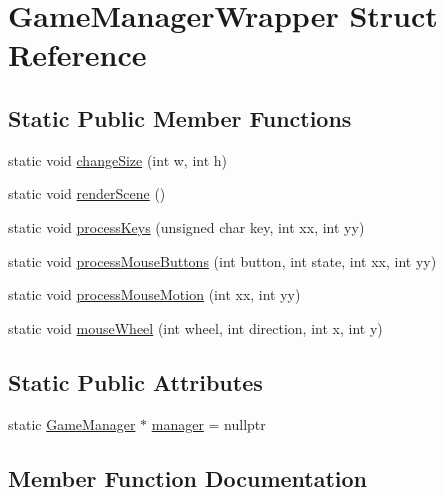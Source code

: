 \hypertarget{struct_game_manager_wrapper}{}\section{Game\+Manager\+Wrapper Struct Reference}
\label{struct_game_manager_wrapper}
\subsection*{Static Public Member Functions}
\begin{DoxyCompactItemize}
\item 
static void \hyperlink{struct_game_manager_wrapper_a5ef7f6979833682944d4d3bedbc78b13}{change\+Size} (int w, int h)
\item 
static void \hyperlink{struct_game_manager_wrapper_a9a5d501d0990f753029d712684421c5c}{render\+Scene} ()
\item 
static void \hyperlink{struct_game_manager_wrapper_a22481b9f1883dbedf4471622261b6530}{process\+Keys} (unsigned char key, int xx, int yy)
\item 
static void \hyperlink{struct_game_manager_wrapper_a517584b9d6f8d3695645ee1e96d3539c}{process\+Mouse\+Buttons} (int button, int state, int xx, int yy)
\item 
static void \hyperlink{struct_game_manager_wrapper_a67b8c7288c1868389bbf55d14c450b61}{process\+Mouse\+Motion} (int xx, int yy)
\item 
static void \hyperlink{struct_game_manager_wrapper_adfc80e5152ed245983e175a570a2c803}{mouse\+Wheel} (int wheel, int direction, int x, int y)
\end{DoxyCompactItemize}
\subsection*{Static Public Attributes}
\begin{DoxyCompactItemize}
\item 
static \hyperlink{class_game_manager}{Game\+Manager} $\ast$ \hyperlink{struct_game_manager_wrapper_a67a006a4732fbc577974dc9c7ce118d5}{manager} = nullptr
\end{DoxyCompactItemize}


\subsection{Member Function Documentation}
\mbox{\label{struct_game_manager_wrapper_a5ef7f6979833682944d4d3bedbc78b13}} 
